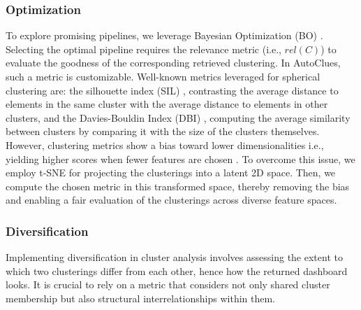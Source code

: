 \subsubsection{Optimization}
To explore promising pipelines, we leverage Bayesian Optimization (BO) \cite{hutter2011sequential}.
Selecting the optimal pipeline requires the relevance metric (i.e., $rel(C)$) to evaluate the goodness of the corresponding retrieved clustering.
In AutoClues, such a metric is customizable.
Well-known metrics leveraged for spherical clustering are: the silhouette index (SIL) \cite{zhu2010clustering}, contrasting the average distance to elements in the same cluster with the average distance to elements in other clusters, and the Davies-Bouldin Index (DBI) \cite{dbi}, computing the average similarity between clusters by comparing it with the size of the clusters themselves.
%
However, clustering metrics show a bias toward lower dimensionalities i.e., yielding higher scores when fewer features are chosen \cite{lensen2017using,hancer2020new}.
To overcome this issue, we employ t-SNE \cite{van2008visualizing} for projecting the clusterings into a latent 2D space.
Then, we compute the chosen metric in this transformed space, thereby removing the bias and enabling a fair evaluation of the clusterings across diverse feature spaces.


\subsubsection{Diversification}
Implementing diversification in cluster analysis involves assessing the extent to which two clusterings differ from each other, hence how the returned dashboard looks.
It is crucial to rely on a metric that considers not only shared cluster membership but also structural interrelationships within them.

